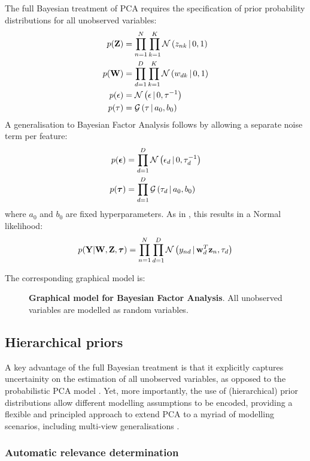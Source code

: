 The full Bayesian treatment of PCA requires the specification of prior probability distributions for all unobserved variables:
\begin{align*}
	p({\bf Z}) &= \prod_{n=1}^{N} \prod_{k=1}^{K} \mathcal{N}\left(z_{nk} \,|\, 0,1\right) \\
	p({\bf W}) &= \prod_{d=1}^{D} \prod_{k=1}^{K} \mathcal{N}\left(w_{dk} \,|\, 0,1\right) \\
	p(\epsilon) &= \mathcal{N}\left(\epsilon \,|\, 0,\tau^{-1}\right) \\
	p(\tau) &= \mathcal{G}\left(\tau \,|\, a_0,b_0\right)
\end{align*}
A generalisation to Bayesian Factor Analysis follows by allowing a separate noise term per feature:
\begin{align*}
	p(\mbox{\boldmath $\epsilon$}) &= \prod_{d=1}^{D} \mathcal{N}\left(\epsilon_d \,|\, 0,\tau_d^{-1}\right) \\
	p(\mbox{\boldmath $\tau$}) &= \prod_{d=1}^{D} \mathcal{G}\left(\tau_d \,|\, a_0,b_0\right)
\end{align*}
where $a_0$ and $b_0$ are fixed hyperparameters. As in , this results in a Normal likelihood:
\[
	p({\bf Y}|{\bf W},{\bf Z},\mbox{\boldmath $\tau$}) = \prod_{n=1}^{N} \prod_{d=1}^{D} \mathcal{N}\left(y_{nd} \,|\, {\bf w}_{d}^T {\bf z}_{n},\tau_d\right)
\]

The corresponding graphical model is:

\begin{figure}[H] 
	\centering
	
	\caption{\textbf{Graphical model for Bayesian Factor Analysis}. All unobserved variables are modelled as random variables.}
	\label{fig:bayesianFA}
\end{figure}


\subsection{Hierarchical priors}  \label{section:hierarchical_priors}

A key advantage of the full Bayesian treatment is that it explicitly captures uncertainity on the estimation of all unobserved variables, as opposed to the probabilistic PCA model \cite{Bishop1999a,Bishop1999b}. Yet, more importantly, the use of (hierarchical) prior distributions allow different modelling assumptions to be encoded, providing a flexible and principled approach to extend PCA to a myriad of modelling scenarios, including multi-view generalisations \cite{Klami2008,Virtanen2012,Klami2015,Bunte2016,Khan2014,Zhao2016}.

\subsubsection{Automatic relevance determination} \label{section:ard}


